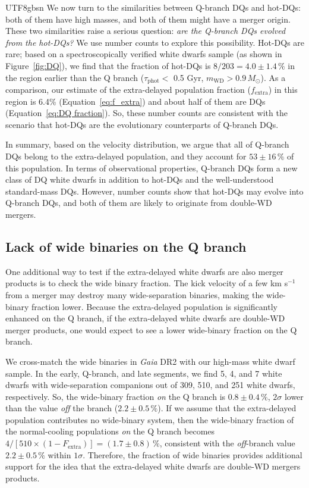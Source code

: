 \documentclass[twocolumn, times, trackchanges]{aastex63_bren}
\begin{document}
\begin{CJK*}{UTF8}{gbsn}
We now turn to the similarities between Q-branch DQs and hot-DQs: both of them have high masses, and both of them might have a merger origin. These two similarities raise a serious question: \emph{are the Q-branch DQs evolved from the hot-DQs?} We use number counts to explore this possibility. Hot-DQs are rare; based on a spectroscopically verified white dwarfs sample (as shown in Figure~\ref{fig:DQ}), we find that the fraction of hot-DQs is $8 / 203 =4.0\pm1.4\,\%$ in the region earlier than the Q branch ($\tau_\text{phot}<$ 0.5 Gyr, $m_\text{WD}>0.9\,M_\odot$). As a comparison, our estimate of the extra-delayed population fraction ($f_\text{extra}$) in this region is 6.4\% (Equation~\ref{eq:f_extra}) and about half of them are DQs (Equation~\ref{eq:DQ fraction}). So, these number counts are consistent with the scenario that hot-DQs are the evolutionary counterparts of Q-branch DQs.

In summary, based on the velocity distribution, we argue that all of Q-branch DQs belong to the extra-delayed population, and they account for $53\pm16\,\%$ of this population. In terms of observational properties, Q-branch DQs form a new class of DQ white dwarfs in addition to hot-DQs and the well-understood standard-mass DQs. However, number counts show that hot-DQs may evolve into Q-branch DQs, and both of them are likely to originate from double-WD mergers.


\subsection{Lack of wide binaries on the Q branch}
\label{sec:wide binary}

One additional way to test if the extra-delayed white dwarfs are also merger products is to check the wide binary fraction. The kick velocity of a few km s$^{-1}$ \citep[estimated from the results of][]{Dan_2014} from a merger may destroy many wide-separation binaries, making the wide-binary fraction lower. Because the extra-delayed population is significantly enhanced on the Q branch, if the extra-delayed white dwarfs are double-WD merger products, one would expect to see a lower wide-binary fraction on the Q branch.

We cross-match the wide binaries in {\it Gaia} DR2 \citep{El-Badry_2018, El-Badry_2019} with our high-mass white dwarf sample. In the early, Q-branch, and late segments, we find 5, 4, and 7 white dwarfs with wide-separation companions out of 309, 510, and 251 white dwarfs, respectively. So, the wide-binary fraction \emph{on} the Q branch is $0.8\pm0.4\,\%$, $2\sigma$ lower than the value \emph{off} the branch ($2.2\pm0.5\,\%$). If we assume that the extra-delayed population contributes no wide-binary system, then the wide-binary fraction of the normal-cooling populations \emph{on} the Q branch becomes $4/[510\times(1-F_\text{extra})]=(1.7\pm0.8)\,\%$, consistent with the \emph{off}-branch value $2.2\pm0.5\,\%$ within $1\sigma$. Therefore, the fraction of wide binaries provides additional support for the idea that the extra-delayed white dwarfs are double-WD mergers products.



\end{CJK*}
\end{document}
